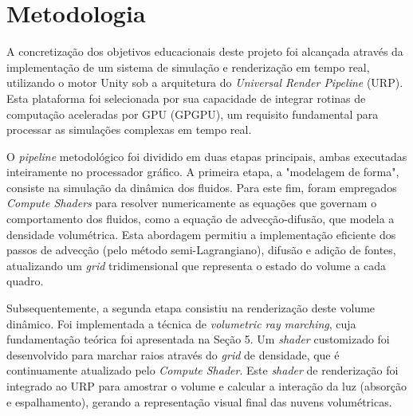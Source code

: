 \section{Metodologia}
\label{sec:metodologia}

A concretização dos objetivos educacionais deste projeto foi alcançada através da implementação de um sistema de simulação e renderização em tempo real, utilizando o motor Unity sob a arquitetura do \textit{Universal Render Pipeline} (URP). Esta plataforma foi selecionada por sua capacidade de integrar rotinas de computação aceleradas por GPU (GPGPU), um requisito fundamental para processar as simulações complexas em tempo real.

O \textit{pipeline} metodológico foi dividido em duas etapas principais, ambas executadas inteiramente no processador gráfico. A primeira etapa, a "modelagem de forma", consiste na simulação da dinâmica dos fluidos. Para este fim, foram empregados \textit{Compute Shaders} para resolver numericamente as equações que governam o comportamento dos fluidos, como a equação de advecção-difusão, que modela a densidade volumétrica. Esta abordagem permitiu a implementação eficiente dos passos de advecção (pelo método semi-Lagrangiano), difusão e adição de fontes, atualizando um \textit{grid} tridimensional que representa o estado do volume a cada quadro.

Subsequentemente, a segunda etapa consistiu na renderização deste volume dinâmico. Foi implementada a técnica de \textit{volumetric ray marching}, cuja fundamentação teórica foi apresentada na Seção 5. Um \textit{shader} customizado foi desenvolvido para marchar raios através do \textit{grid} de densidade, que é continuamente atualizado pelo \textit{Compute Shader}. Este \textit{shader} de renderização foi integrado ao URP para amostrar o volume e calcular a interação da luz (absorção e espalhamento), gerando a representação visual final das nuvens volumétricas.


